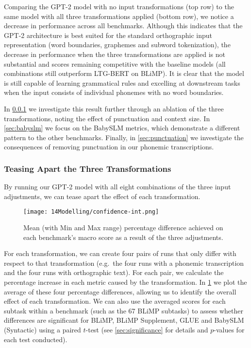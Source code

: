 Comparing the \mbox{GPT-2} model with no input transformations (top row) to the same model with all three transformations applied (bottom row), we notice a decrease in performance across all benchmarks. Although this indicates that the \mbox{GPT-2} architecture is best suited for the standard orthographic input representation (word boundaries, graphemes and subword tokenization), the decrease in performance when the three transformations are applied is not substantial and scores remaining competitive with the baseline models (all combinations still outperform LTG-BERT on BLiMP). It is clear that the model is still capable of learning grammatical rules and excelling at downstream tasks when the input consists of individual phonemes with no word boundaries. 

In \cref{sec:effect} we investigate this result further through an ablation of the three transformations, noting the effect of punctuation and context size. In \cref{sec:babyslm} we focus on the BabySLM metrics, which demonstrate a different pattern to the other benchmarks. Finally, in \cref{sec:punctuation} we investigate the consequences of removing punctuation in our phonemic transcriptions.

\subsubsection{Teasing Apart the Three Transformations}
\label{sec:effect}

By running our GPT-2 model with all eight combinations of the three input adjustments, we can tease apart the effect of each transformation.

\begin{figure}
    \centering
    \texttt{[image: 14Modelling/confidence-int.png]}
      \caption{Mean (with Min and Max range) percentage difference achieved on each benchmark's macro score as a result of the three adjustments.}
    \label{fig:condition-differences}
\vspace{-4mm}
\end{figure}

For each transformation, we can create four pairs of runs that only differ with respect to that transformation (e.g.\ the four runs with a phonemic transcription and the four runs with orthographic text). For each pair, we calculate the percentage increase in each metric caused by the transformation. In \cref{fig:condition-differences} we plot the average of these four percentage differences, allowing us to identify the overall effect of each transformation. We can also use the averaged scores for each subtask within a benchmark (such as the 67 BLiMP subtasks) to assess whether differences are significant for BLiMP, BLiMP Supplement, GLUE and BabySLM (Syntactic) using a paired $t$-test (see \cref{sec:significance} for details and $p$-values for each test conducted).


